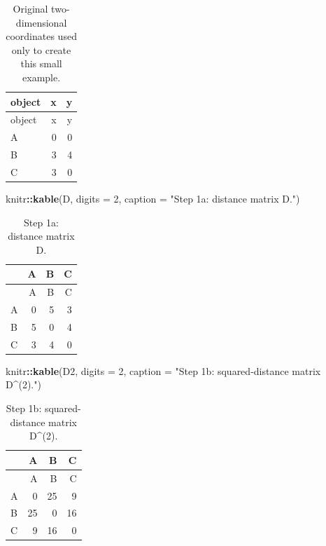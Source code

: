 \documentclass[
  english,
]{article}
\newenvironment{Shaded}{\begin{snugshade}}{\end{snugshade}}
\newcommand{\AttributeTok}[1]{\textcolor[rgb]{0.13,0.29,0.53}{#1}}
\newcommand{\DecValTok}[1]{\textcolor[rgb]{0.00,0.00,0.81}{#1}}
\newcommand{\FunctionTok}[1]{\textcolor[rgb]{0.13,0.29,0.53}{\textbf{#1}}}
\newcommand{\NormalTok}[1]{#1}
\newcommand{\SpecialCharTok}[1]{\textcolor[rgb]{0.81,0.36,0.00}{\textbf{#1}}}
\newcommand{\StringTok}[1]{\textcolor[rgb]{0.31,0.60,0.02}{#1}}
\begin{document}
\begin{longtable}[]{@{}lrr@{}}
\caption{Original two-dimensional coordinates used only to create this
small example.}\tabularnewline
\toprule\noalign{}
object & x & y \\
\midrule\noalign{}
\endfirsthead
\toprule\noalign{}
object & x & y \\
\midrule\noalign{}
\endhead
\bottomrule\noalign{}
\endlastfoot
A & 0 & 0 \\
B & 3 & 4 \\
C & 3 & 0 \\
\end{longtable}

\begin{Shaded}
\begin{Highlighting}[]
\NormalTok{knitr}\SpecialCharTok{::}\FunctionTok{kable}\NormalTok{(D, }\AttributeTok{digits =} \DecValTok{2}\NormalTok{, }\AttributeTok{caption =} \StringTok{"Step 1a: distance matrix D."}\NormalTok{)}
\end{Highlighting}
\end{Shaded}

\begin{longtable}[]{@{}lrrr@{}}
\caption{Step 1a: distance matrix D.}\tabularnewline
\toprule\noalign{}
& A & B & C \\
\midrule\noalign{}
\endfirsthead
\toprule\noalign{}
& A & B & C \\
\midrule\noalign{}
\endhead
\bottomrule\noalign{}
\endlastfoot
A & 0 & 5 & 3 \\
B & 5 & 0 & 4 \\
C & 3 & 4 & 0 \\
\end{longtable}

\begin{Shaded}
\begin{Highlighting}[]
\NormalTok{knitr}\SpecialCharTok{::}\FunctionTok{kable}\NormalTok{(D2, }\AttributeTok{digits =} \DecValTok{2}\NormalTok{, }\AttributeTok{caption =} \StringTok{"Step 1b: squared{-}distance matrix D\^{}(2)."}\NormalTok{)}
\end{Highlighting}
\end{Shaded}

\begin{longtable}[]{@{}lrrr@{}}
\caption{Step 1b: squared-distance matrix D\^{}(2).}\tabularnewline
\toprule\noalign{}
& A & B & C \\
\midrule\noalign{}
\endfirsthead
\toprule\noalign{}
& A & B & C \\
\midrule\noalign{}
\endhead
\bottomrule\noalign{}
\endlastfoot
A & 0 & 25 & 9 \\
B & 25 & 0 & 16 \\
C & 9 & 16 & 0 \\
\end{longtable}
\end{document}
